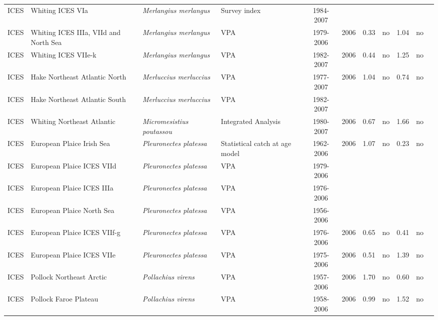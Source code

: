 \begin{longtable}{p{1.8cm}p{3.5cm}p{3.5cm}p{3cm}cccp{0.9cm}cp{0.9cm}c}
  ICES & Whiting ICES VIa & \textit{Merlangius merlangus} & Survey index & 1984-2007 &  &  &  &  &  & \cite{ICES-WGNSDS-2007.pdf} \\ 
  ICES & Whiting ICES IIIa, VIId and North Sea & \textit{Merlangius merlangus} & VPA & 1979-2006 & 2006 & 0.33 & no & 1.04 & no & \cite{ICES-WGNSSK-2007.pdf} \\ 
  ICES & Whiting ICES VIIe-k & \textit{Merlangius merlangus} & VPA & 1982-2007 & 2006 & 0.44 & no & 1.25 & no & \cite{ICES-WGSSDS-2007.pdf} \\ 
  ICES & Hake Northeast Atlantic North & \textit{Merluccius merluccius} & VPA & 1977-2007 & 2006 & 1.04 & no & 0.74 & no & \cite{ICES-WGHMM-2007.pdf} \\ 
  ICES & Hake Northeast Atlantic South & \textit{Merluccius merluccius} & VPA & 1982-2007 &  &  &  &  &  & \cite{ICES-WGHMM-2007.pdf} \\ 
  ICES & Whiting Northeast Atlantic & \textit{Micromesistius poutassou} & Integrated Analysis & 1980-2007 & 2006 & 0.67 & no & 1.66 & no & \cite{ICES-WGNPBW-2007.pdf} \\ 
  ICES & European Plaice Irish Sea & \textit{Pleuronectes platessa} & Statistical catch at age model & 1962-2006 & 2006 & 1.07 & no & 0.23 & no & \cite{ICES-WGNSDS-2007.pdf} \\ 
  ICES & European Plaice ICES VIId & \textit{Pleuronectes platessa} & VPA & 1979-2006 &  &  &  &  &  & \cite{ICES-WGNSSK-2007.pdf} \\ 
  ICES & European Plaice ICES IIIa & \textit{Pleuronectes platessa} & VPA & 1976-2006 &  &  &  &  &  & \cite{ICES-WGNSSK-2007.pdf} \\ 
  ICES & European Plaice North Sea & \textit{Pleuronectes platessa} & VPA & 1956-2006 &  &  &  &  &  & \cite{ICES-WGNSSK-2007.pdf} \\ 
  ICES & European Plaice ICES VIIf-g & \textit{Pleuronectes platessa} & VPA & 1976-2006 & 2006 & 0.65 & no & 0.41 & no & \cite{ICES-WGSSDS-2007.pdf} \\ 
  ICES & European Plaice ICES VIIe & \textit{Pleuronectes platessa} & VPA & 1975-2006 & 2006 & 0.51 & no & 1.39 & no & \cite{ICES-WGSSDS-2007.pdf} \\ 
  ICES & Pollock Northeast Arctic & \textit{Pollachius virens} & VPA & 1957-2006 & 2006 & 1.70 & no & 0.60 & no & \cite{ICES-AFWG-2007.pdf} \\ 
  ICES & Pollock Faroe Plateau & \textit{Pollachius virens} & VPA & 1958-2006 & 2006 & 0.99 & no & 1.52 & no & \cite{ICES-NWWG-2007.pdf} \\ 

\end{longtable}
